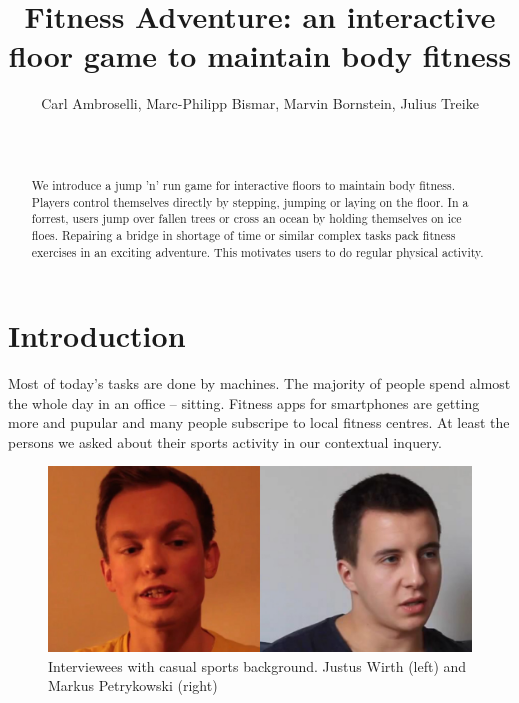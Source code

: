 \documentclass{sigchi}
\begin{document}
  \title{Fitness Adventure: an interactive floor game to maintain body fitness}

  \author{
    \alignauthor Carl Ambroselli, Marc-Philipp Bismar, Marvin Bornstein, Julius Treike\\
    \\
    \\
  }

  \maketitle

  \begin{abstract}
    We introduce a jump 'n' run game for interactive floors to maintain body fitness. Players control themselves directly by stepping, jumping or laying on the floor. In a forrest, users jump over fallen trees or cross an ocean by holding themselves on ice floes. Repairing a bridge in shortage of time or similar complex tasks pack fitness exercises in an exciting adventure. This motivates users to do regular physical activity.
  \end{abstract}

  \section{Introduction}
    Most of today's tasks are done by machines. The majority of people spend almost the whole day in an office -- sitting.
    Fitness apps for smartphones are getting more and pupular and many people subscripe to local fitness centres. 
    At least the persons we asked about their sports activity in our contextual inquery. 

    \begin{figure}[ht]
      \centering
      \includegraphics[width=\columnwidth]{users_casual}
      \caption{Interviewees with casual sports background. Justus Wirth (left) and Markus Petrykowski (right)}
      \label{fig:users_casual}
    \end{figure}
\end{document}
